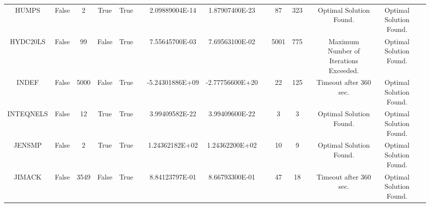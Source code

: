 \begin{longtable}{ccccccccccccccc}
	\cellcolor{default2} HUMPS& \cellcolor{default2} False& \cellcolor{default2} 2& \cellcolor{default2} True& \cellcolor{default2} True& \cellcolor{header} & \cellcolor{ok} 2.09889004E-14& \cellcolor{best} 1.87907400E-23& \cellcolor{header} & \cellcolor{best} 87& \cellcolor{poor} 323& \cellcolor{header} & \cellcolor{default2} Optimal Solution Found.& \cellcolor{default2} Optimal Solution Found.& \cellcolor{header} \\
	\cellcolor{default1} HYDC20LS& \cellcolor{default1} False& \cellcolor{default1} 99& \cellcolor{default1} False& \cellcolor{default1} True& \cellcolor{header} & \cellcolor{best} 7.55645700E-03& \cellcolor{poor} 7.69563100E-02& \cellcolor{header} & \cellcolor{poor} 5001& \cellcolor{best} 775& \cellcolor{header} & \cellcolor{default1} Maximum Number of Iterations Exceeded.& \cellcolor{default1} Optimal Solution Found.& \cellcolor{header} \\
	\cellcolor{default2} INDEF& \cellcolor{default2} False& \cellcolor{default2} 5000& \cellcolor{default2} False& \cellcolor{default2} True& \cellcolor{header} & \cellcolor{poor} -5.24301886E+09& \cellcolor{best} -2.77756600E+20& \cellcolor{header} & \cellcolor{best} 22& \cellcolor{poor} 125& \cellcolor{header} & \cellcolor{default2} Timeout after 360 sec.& \cellcolor{default2} Optimal Solution Found.& \cellcolor{header} \\
	\cellcolor{default1} INTEQNELS& \cellcolor{default1} False& \cellcolor{default1} 12& \cellcolor{default1} True& \cellcolor{default1} True& \cellcolor{header} & \cellcolor{best} 3.99409582E-22& \cellcolor{ok} 3.99409600E-22& \cellcolor{header} & \cellcolor{best} 3& \cellcolor{best} 3& \cellcolor{header} & \cellcolor{default1} Optimal Solution Found.& \cellcolor{default1} Optimal Solution Found.& \cellcolor{header} \\
	\cellcolor{default2} JENSMP& \cellcolor{default2} False& \cellcolor{default2} 2& \cellcolor{default2} True& \cellcolor{default2} True& \cellcolor{header} & \cellcolor{best} 1.24362182E+02& \cellcolor{ok} 1.24362200E+02& \cellcolor{header} & \cellcolor{ok} 10& \cellcolor{best} 9& \cellcolor{header} & \cellcolor{default2} Optimal Solution Found.& \cellcolor{default2} Optimal Solution Found.& \cellcolor{header} \\
	\cellcolor{default1} JIMACK& \cellcolor{default1} False& \cellcolor{default1} 3549& \cellcolor{default1} False& \cellcolor{default1} True& \cellcolor{header} & \cellcolor{poor} 8.84123797E-01& \cellcolor{best} 8.66793300E-01& \cellcolor{header} & \cellcolor{poor} 47& \cellcolor{best} 18& \cellcolor{header} & \cellcolor{default1} Timeout after 360 sec.& \cellcolor{default1} Optimal Solution Found.& \cellcolor{header} \\

\end{longtable}
